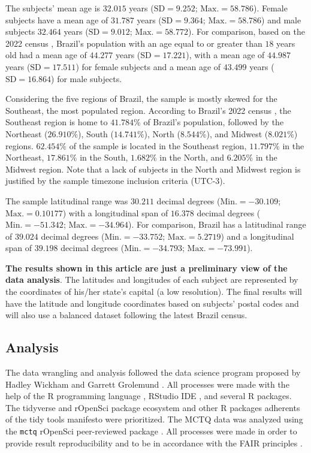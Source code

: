 \documentclass[
12pt,
openright,
oneside,
a4paper,
chapter=TITLE,
section=TITLE,
french,
spanish,
brazil,
english
]{abntex2}\usepackage{array}
\begin{document}
The subjects' mean age is \(32.015\) years (\(\text{SD} = 9.252\);
\(\text{Max.} = 58.786\)). Female subjects have a mean age of \(31.787\)
years (\(\text{SD} = 9.364\); \(\text{Max.} = 58.786\)) and male
subjects \(32.464\) years (\(\text{SD} = 9.012\);
\(\text{Max.} = 58.772\)). For comparison, based on the 2022 census
\autocite{ibgeb}, Brazil's population with an age equal to or greater
than \(18\) years old had a mean age of \(44.277\) years
(\(\text{SD} = 17.221\)), with a mean age of \(44.987\) years
(\(\text{SD} = 17.511\)) for female subjects and a mean age of
\(43.499\) years (\(\text{SD} = 16.864\)) for male subjects.

Considering the five regions of Brazil, the sample is mostly skewed for
the Southeast, the most populated region. According to Brazil's 2022
census \autocite{ibge2022}, the Southeast region is home to \(41.784\%\)
of Brazil's population, followed by the Northeast (\(26.910\%\)), South
(\(14.741\%\)), North (\(8.544\%\)), and Midwest (\(8.021\%\)) regions.
\(62.454\%\) of the sample is located in the Southeast region,
\(11.797\%\) in the Northeast, \(17.861\%\) in the South, \(1.682\%\) in
the North, and \(6.205\%\) in the Midwest region. Note that a lack of
subjects in the North and Midwest region is justified by the sample
timezone inclusion criteria (UTC-3).

The sample latitudinal range was \(30.211\) decimal degrees
(\(\text{Min.} = -30.109\); \(\text{Max.} = 0.10177\)) with a
longitudinal span of \(16.378\) decimal degrees
(\(\text{Min.} = -51.342\); \(\text{Max.} = -34.964\)). For comparison,
Brazil has a latitudinal range of \(39.024\) decimal degrees
(\(\text{Min.} = -33.752\); \(\text{Max.} = 5.2719\)) and a longitudinal
span of \(39.198\) decimal degrees (\(\text{Min.} = -34.793\);
\(\text{Max.} = -73.991\)).

\textbf{The results shown in this article are just a preliminary view of
the data analysis}. The latitudes and longitudes of each subject are
represented by the coordinates of his/her state's capital (a low
resolution). The final results will have the latitude and longitude
coordinates based on subjects' postal codes and will also use a balanced
dataset following the latest Brazil census.

\subsection{Analysis}\label{analysis}

The data wrangling and analysis followed the data science program
proposed by Hadley Wickham and Garrett Grolemund \autocite{wickham2016}.
All processes were made with the help of the R programming language
\autocite{rcoreteam}, RStudio IDE \autocite{positteam}, and several R
packages. The tidyverse and rOpenSci package ecosystem and other R
packages adherents of the tidy tools manifesto \autocite{wickham2023a}
were prioritized. The MCTQ data was analyzed using the \texttt{mctq}
rOpenSci peer-reviewed package \autocite{vartanian2023}. All processes
were made in order to provide result reproducibility and to be in
accordance with the FAIR principles \autocite{wilkinson2016}.
\end{document}
